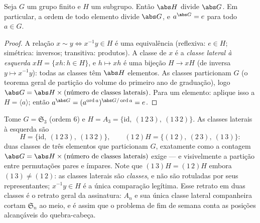 \begin{theorem}[Lagrange]\label{thm:b2:structures:lagrange}
Seja $G$ um grupo finito e $H$ um subgrupo. Então $\abs H$ divide
$\abs G$. Em particular, a ordem de todo
elemento divide $\abs G$, e $a^{\abs G} = e$ para todo $a \in G$.
\end{theorem}

\begin{proof}
A relação $x \sim y \iff x^{-1}y \in H$ é uma equivalência
(reflexiva: $e \in H$; simétrica: inversos; transitiva: produtos).
A classe de $x$ é a \emph{classe lateral à esquerda} $xH = \{xh : h \in H\}$,
e $h \mapsto xh$ é uma bijeção $H \to xH$ (de inversa $y \mapsto
x^{-1}y$): todas as classes têm $\abs H$ elementos. As classes particionam $G$
(o teorema geral de partição do volume do primeiro ano de graduação), logo $\abs G =
\abs H \times (\text{número de classes laterais})$. Para um elemento: aplique isso
a $H = \langle a\rangle$; então $a^{\abs G} = (a^{\operatorname{ord}
a})^{\abs G / \operatorname{ord} a} = e$.
\end{proof}

\begin{example}\label{ex:b2:structures:cosets}
Tome $G = \mathfrak{S}_3$ (ordem $6$) e $H = A_3 =
\{\mathrm{id},\ (1\,2\,3),\ (1\,3\,2)\}$. As classes laterais à esquerda são
\[
H = \{\mathrm{id},\ (1\,2\,3),\ (1\,3\,2)\},
\qquad
(1\,2)H = \{(1\,2),\ (2\,3),\ (1\,3)\} :
\]
duas classes de três elementos que particionam $G$, exatamente como a
contagem $\abs G = \abs H \times (\text{número de classes laterais})$
exige --- e visivelmente a partição entre permutações pares e
ímpares. Note que $(1\,3)H = (1\,2)H$ embora $(1\,3) \neq
(1\,2)$: as classes laterais são \emph{classes}, e não são rotuladas por seus
representantes; $x^{-1}y \in H$ é a única
comparação legítima. Esse retrato em duas classes é o retrato geral da
assinatura: $A_n$ e sua única classe lateral companheira cortam
$\mathfrak{S}_n$ ao meio, e é assim que o problema de fim de semana
conta as posições alcançáveis do quebra-cabeça.
\end{example}

